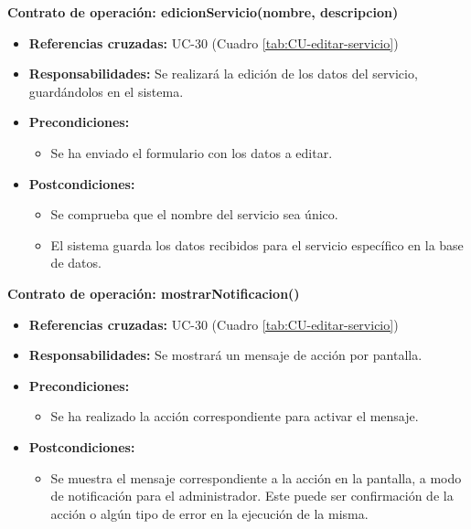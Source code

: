 \textbf{Contrato de operación: edicionServicio(nombre, descripcion)}
\begin{itemize}
\item \textbf{Referencias cruzadas:} UC-30 (Cuadro \ref{tab:CU-editar-servicio})
\item \textbf{Responsabilidades:} Se realizará la edición de los datos del servicio, guardándolos en el sistema.
\item \textbf{Precondiciones:} 
 \begin{itemize}
\item Se ha enviado el formulario con los datos a editar.
\end {itemize}
\item \textbf{Postcondiciones:} 
 \begin{itemize}
 \item Se comprueba que el nombre del servicio sea único.
\item El sistema guarda los datos recibidos para el servicio específico en la base de datos.
\end {itemize}
\end {itemize}

\textbf{Contrato de operación: mostrarNotificacion()}
\begin{itemize}
\item \textbf{Referencias cruzadas:} UC-30 (Cuadro \ref{tab:CU-editar-servicio})
\item \textbf{Responsabilidades:} Se mostrará un mensaje de acción por pantalla.
\item \textbf{Precondiciones:} 
 \begin{itemize}
\item Se ha realizado la acción correspondiente para activar el mensaje.
\end {itemize}
\item \textbf{Postcondiciones:} 
 \begin{itemize}
\item Se muestra el mensaje correspondiente a la acción en la pantalla, a modo de notificación para el administrador. Este puede ser confirmación de la acción o algún tipo de error en la ejecución de la misma.
\end {itemize}
\end {itemize}


\vspace{7mm}
\dotfill
\vspace{7mm}

